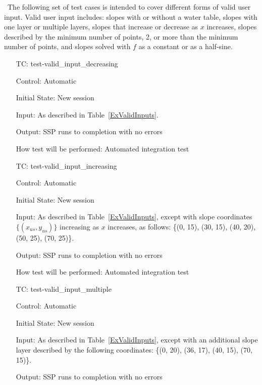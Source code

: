 \documentclass[12pt, titlepage]{article}
\newcounter{testnum} %
\newcommand{\progname}{SSP}
\begin{document}
~\newline \noindent The following set of test cases is intended to cover 
different forms of valid user input. Valid user input includes: slopes with or 
without a water table, slopes with one layer or multiple layers, slopes that 
increase or decrease as $x$ increases, slopes described by the minimum number 
of points, 2, or more than the minimum number of points, and slopes solved with 
$f$ as a constant or as a half-sine.

\begin{enumerate}[label=TC\arabic*:,ref={\arabic*}]

\item [TC\refstepcounter{testnum}\thetestnum: \label{TC_ValidInDec}] 
test-valid\_input\_decreasing

Control: Automatic
					
Initial State: New session
					
Input: As described in Table~\ref{ExValidInputs}.
					
Output: \progname{} runs to completion with no errors

How test will be performed: Automated integration test
					
\item [TC\refstepcounter{testnum}\thetestnum: \label{TC_ValidInInc}] 
test-valid\_input\_increasing

Control: Automatic

Initial State: New session

Input: As described in Table~\ref{ExValidInputs}, except with slope coordinates 
$\{\left(x_{us},y_{us}\right)\}$ increasing as $x$ increases, as follows: \{(0, 
15), (30, 15), (40, 20), (50, 25), (70, 25)\}.

Output: \progname{} runs to completion with no errors

How test will be performed: Automated integration test

\item [TC\refstepcounter{testnum}\thetestnum: \label{TC_ValidInMultiple}] 
test-valid\_input\_multiple

Control: Automatic

Initial State: New session

Input: As described in Table~\ref{ExValidInputs}, except with an additional 
slope layer described by the following coordinates: \{(0, 20), (36, 17), (40, 
15), (70, 15)\}.

Output: \progname{} runs to completion with no errors


\end{enumerate}
\end{document}
